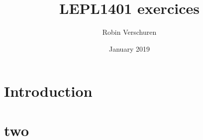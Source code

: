 \documentclass{article}
\title{LEPL1401 exercices}
\author{Robin Verschuren}
\date{January 2019}
\begin{document}
\maketitle
\tableofcontents

\section{Introduction}


\section{two}
\end{document}

